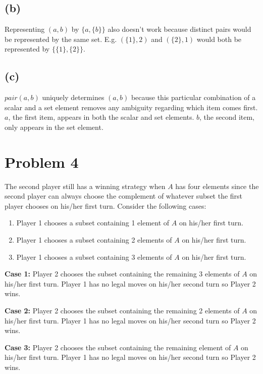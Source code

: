 \documentclass{article}
\begin{document}
\subsection{(b)}
Representing $(a, b)$ by $\{a,\{b\}\}$ also doesn't work because distinct pairs would be represented by the same set. E.g. $(\{1\},2)$ and $(\{2\},1)$ would both be represented by $\{\{1\},\{2\}\}$.

\subsection{(c)}
$pair(a,b)$ uniquely determines $(a,b)$ because this particular combination of a scalar and a set element removes any ambiguity regarding which item comes first. $a$, the first item, appears in both the scalar and set elements. $b$, the second item, only appears in the set element.

\pagebreak

\section{Problem 4}
The second player still has a winning strategy when $A$ has four elements since the second player can always choose the complement of whatever subset the first player chooses on his/her first turn. Consider the following cases:
\begin{enumerate}
	\item Player 1 chooses a subset containing 1 element of $A$ on his/her first turn.
	\item Player 1 chooses a subset containing 2 elements of $A$ on his/her first turn.
	\item Player 1 chooses a subset containing 3 elements of $A$ on his/her first turn.
\end{enumerate}

\textbf{Case 1:}
Player 2 chooses the subset containing the remaining 3 elements of $A$ on his/her first turn. Player 1 has no legal moves on his/her second turn so Player 2 wins.

\textbf{Case 2:}
Player 2 chooses the subset containing the remaining 2 elements of $A$ on his/her first turn. Player 1 has no legal moves on his/her second turn so Player 2 wins.

\textbf{Case 3:}
Player 2 chooses the subset containing the remaining element of $A$ on his/her first turn. Player 1 has no legal moves on his/her second turn so Player 2 wins.

\pagebreak
\end{document}
